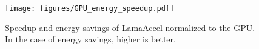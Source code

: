 \begin{figure}[t!]
\centering
\texttt{[image: figures/GPU\_energy\_speedup.pdf]}
\caption{Speedup and energy savings of LamaAccel normalized to the GPU. In the case of energy savings, higher is better.}
\label{fig:case_study2_evaluation_gpu}
\vskip -0.15in
\end{figure}
